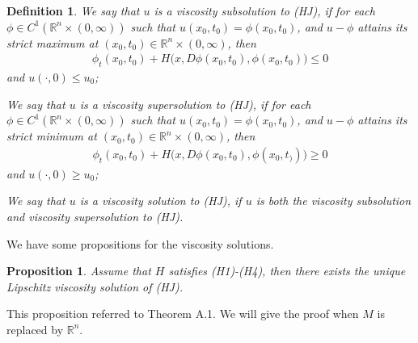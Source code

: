 \documentclass[preprint]{elsarticle}
\newtheorem{proposition}{Proposition}[section]
\newtheorem{definition}{Definition}[section]
\numberwithin{equation}{section}
\begin{document}
\begin{definition}
    \item[(i)] We say that $u$ is a viscosity subsolution to (HJ), if for each $\phi \in C^1(\mathbb R^n \times (0,\infty))$ such that $u(x_0,t_0)=\phi(x_0,t_0)$, and $u-\phi$ attains its strict maximum at $(x_0,t_0) \in \mathbb R^n \times (0,\infty)$, then 
          \begin{align*}
              \phi_t(x_0,t_0)+H\Big(x,D\phi(x_0,t_0),\phi(x_0,t_0)\Big) \leq 0
          \end{align*}
    and $u(\cdot ,0) \leq u_0$;
    \item[(ii)] We say that $u$ is a viscosity supersolution to (HJ), if for each $\phi \in C^1(\mathbb R^n \times (0,\infty))$ such that $u(x_0,t_0)=\phi(x_0,t_0)$, and $u-\phi$ attains its strict minimum at $(x_0,t_0) \in \mathbb R^n \times (0,\infty)$, then 
          \begin{align*}
              \phi_t(x_0,t_0)+H\Big(x,D\phi(x_0,t_0),\phi(x_0,t_))\Big) \geq 0
          \end{align*}
    and $u(\cdot ,0) \geq u_0$;
    \item[(iii)] We say that $u$ is a viscosity solution to (HJ), if $u$ is both the viscosity subsolution and viscosity supersolution to (HJ).
\end{definition}

We have some propositions for the viscosity solutions.

\begin{proposition}
    Assume that $H$ satisfies (H1)-(H4), then there exists the unique Lipschitz viscosity solution of (HJ).
\end{proposition}
    
This proposition referred to \cite{ishii2022hamilton} Theorem A.1. We will give the proof when $M$ is replaced by $\mathbb{R}^n$.
\end{document}
